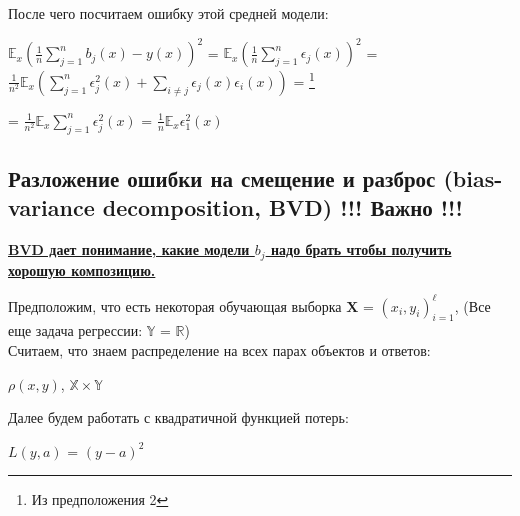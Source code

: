         После чего посчитаем ошибку этой средней модели:
        \begin{center}
        \large
            $\mathbb{E}_x(\frac{1}{n}\sum\limits_{j = 1}^nb_j(x) - y(x))^2$ = $\mathbb{E}_x(\frac{1}{n}\sum\limits_{j = 1}^n\epsilon_j(x))^2$ = $\frac{1}{n^2}\mathbb{E}_x(\sum\limits_{j = 1}^n\epsilon_j^2(x) + \sum\limits_{i \neq j}\epsilon_j(x)\epsilon_i(x))$ = \footnote{Из предположения 2}
        \end{center}
        \begin{center}
            \Large
            = $\frac{1}{n^2}\mathbb{E}_x\sum\limits_{j = 1}^n\epsilon^2_j(x)$ = $\frac{1}{n}\mathbb{E}_x\epsilon_1^2(x)$
        \end{center}


        \subsection{Разложение ошибки на смещение и разброс (bias-variance decomposition, BVD) !!! Важно !!!}
        
            \begin{center}
                \underline{\textbf{BVD дает понимание, какие модели $b_j$ надо брать чтобы получить хорошую композицию.}}
            \end{center}

            Предположим, что есть некоторая обучающая выборка $\mathbf{X}$ = $(x_i, y_i)_{i = 1}^\ell$, \quad (Все еще задача регрессии: $\mathbb{Y}$ = $\mathbb{R}$)\\

            Считаем, что знаем распределение на всех парах объектов и ответов:
            \begin{center}
                $\rho(x, y)$, \quad $\mathbb{X} \times \mathbb{Y}$
            \end{center}

            Далее будем работать с квадратичной функцией потерь:
            \begin{center}
                $L(y, a)$ = $(y - a)^2$
            \end{center}

